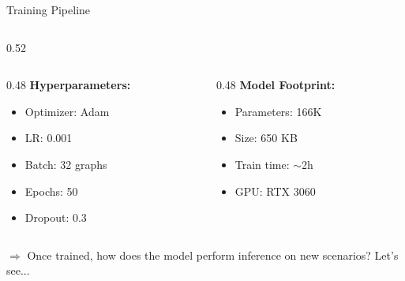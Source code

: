\documentclass[aspectratio=169]{beamer}
\begin{document}
\begin{frame}{Training Pipeline}
\begin{columns}[T]
\begin{column}{0.52\textwidth}
            \begin{columns}[T]
                \begin{column}{0.48\textwidth}
                    \textbf{Hyperparameters:}
                    \begin{itemize}\itemsep0em
                        \item Optimizer: Adam
                        \item LR: 0.001
                        \item Batch: 32 graphs
                        \item Epochs: 50
                        \item Dropout: 0.3
                    \end{itemize}
                \end{column}
                \begin{column}{0.48\textwidth}
                    \textbf{Model Footprint:}
                    \begin{itemize}\itemsep0em
                        \item Parameters: 166K
                        \item Size: 650 KB
                        \item Train time: $\sim$2h
                        \item GPU: RTX 3060
                    \end{itemize}
                \end{column}
            \end{columns}
        \end{column}
    \end{columns}
    
    \vspace{0.15cm}
    \small \textcolor{iiitblue}{$\Rightarrow$ Once trained, how does the model perform inference on new scenarios? Let's see...}
\end{frame}
\end{document}
